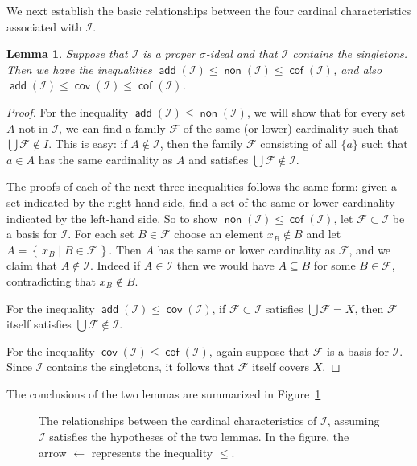 \documentclass[11pt,oneside,a4paper]{amsbook}
\newcommand{\set}[1]{\left\{\,#1\,\right\}}
\DeclareMathOperator{\add}{\mathsf{add}}
\DeclareMathOperator{\non}{\mathsf{non}}
\DeclareMathOperator{\cov}{\mathsf{cov}}
\DeclareMathOperator{\cof}{\mathsf{cof}}
\theoremstyle{definition}
\theoremstyle{plain}
\newtheorem{lemma}[theorem]{Lemma}
\theoremstyle{definition}
\theoremstyle{remark}
\numberwithin{equation}{section}
\numberwithin{figure}{section}
\begin{document}
We next establish the basic relationships between the four cardinal characteristics associated with $\mathcal I$.

\begin{lemma}
  \label{lem:diamond}
  Suppose that $\mathcal I$ is a proper $\sigma$-ideal and that $\mathcal I$ contains the singletons. Then we have the inequalities $\add(\mathcal I)\leq\non(\mathcal I)\leq\cof(\mathcal I)$, and also $\add(\mathcal I)\leq\cov(\mathcal I)\leq\cof(\mathcal I)$.
\end{lemma}

\begin{proof}
  For the inequality $\add(\mathcal{I})\leq\non(\mathcal{I})$, we will show that for every set $A$ not in $\mathcal I$, we can find a family $\mathcal F$ of the same (or lower) cardinality such that $\bigcup\mathcal F\notin I$. This is easy: if $A\notin\mathcal I$, then the family $\mathcal F$ consisting of all $\{a\}$ such that $a\in A$ has the same cardinality as $A$ and satisfies $\bigcup\mathcal F\notin\mathcal I$.

  The proofs of each of the next three inequalities follows the same form: given a set indicated by the right-hand side, find a set of the same or lower cardinality indicated by the left-hand side. So to show $\non(\mathcal I)\leq\cof(\mathcal I)$, let $\mathcal F\subset \mathcal{I}$ be a basis for $\mathcal I$. For each set $B\in\mathcal F$ choose an element $x_B\notin B$ and let $A=\set{x_B\mid B\in\mathcal F}$. Then $A$ has the same or lower cardinality as $\mathcal F$, and we claim that $A\notin\mathcal{I}$. Indeed if $A\in\mathcal{I}$ then we would have $A\subseteq B$ for some $B\in\mathcal F$, contradicting that $x_B\notin B$.

  For the inequality $\add(\mathcal I)\leq\cov(\mathcal I)$, if $\mathcal F\subset\mathcal{I}$ satisfies $\bigcup\mathcal F=X$, then $\mathcal F$ itself satisfies $\bigcup\mathcal F\notin\mathcal I$.

  For the inequality $\cov(\mathcal I)\leq\cof(\mathcal I)$, again suppose that $\mathcal F$ is a basis for $\mathcal I$. Since $\mathcal I$ contains the singletons, it follows that $\mathcal F$ itself covers $X$.
\end{proof}

The conclusions of the two lemmas are summarized in Figure~\ref{fig:ideal}

\begin{figure}[h]
  \caption{The relationships between the cardinal characteristics of $\mathcal I$, assuming $\mathcal I$ satisfies the hypotheses of the two lemmas. In the figure, the arrow $\leftarrow$ represents the inequality $\leq$.\label{fig:ideal}}
\end{figure}
\end{document}
